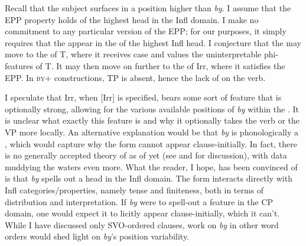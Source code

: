 \documentclass[output=paper,modfonts,newtxmath,hidelinks,]{langscibook}
\begin{document}
\ea \label{10:ex23}
\z\z

\noindent Recall that the subject surfaces in a position higher than \textit{by}. I assume that the EPP property holds of the highest head in the Infl domain. I make no commitment to any particular version of the EPP; for our purposes, it simply requires that the  appear in the  of the highest Infl head. I conjecture that the  may move to the  of T, where it receives case and values the uninterpretable phi-features of T. It may then move on further to the  of Irr, where it satisfies the EPP. In \textsc{by}+ constructions, TP is absent, hence the lack of  on the verb.

I speculate that Irr, when [Irr] is specified, bears some sort of feature that is optionally strong, allowing for the various available positions of \textit{by} within the . It is unclear what exactly this feature is and why it optionally takes the verb or the VP more locally. An alternative explanation would be that \textit{by} is phonologically a , which would capture why the form cannot appear clause-initially. In fact, there is no generally accepted theory of   as of yet (see \citealt{KallestinovaSlabakova2008} and \citealt{Bailyn2011} for discussion), with  data muddying the waters even more. What the reader, I hope, has been convinced of is that \textit{by} spells out a head in the Infl domain. The form interacts directly with Infl categories/properties, namely tense and finiteness, both in terms of distribution and interpretation. If \textit{by} were to spell-out a feature in the CP domain, one would expect it to licitly appear clause-initially, which it can’t. While I have discussed only SVO-ordered clauses, work on \textit{by} in other word orders would shed light on \textit{by}’s position variability.
\end{document}
